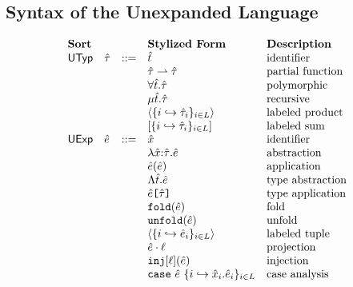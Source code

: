 \subsection{Syntax of the Unexpanded Language}\label{sec:syntax-U}
\begin{figure}[h!]
\[\begin{array}{lllllll}
\textbf{Sort} & &  
& \textbf{Stylized Form} & \textbf{Description}\\
\mathsf{UTyp} & {\hat\tau} & ::= 
& {\hat{t}} & \text{identifier}\\
&& 
& {\hat\tau} \rightharpoonup {\hat\tau} & \text{partial function}\\
&&
& \forall {\hat{t}}.{\hat\tau} & \text{polymorphic}\\
&&
& \mu {\hat{t}}.{\hat\tau} & \text{recursive}\\
&&
& \langle \{i \hookrightarrow {\hat\tau}_{i}\}_{i \in L} \rangle & \text{labeled product}\\
&&
& [\{i \hookrightarrow {\hat\tau}_{i}\}_{i \in L}] & \text{labeled sum}\\
\mathsf{UExp} & {\hat e} & ::= 
& {\hat x} & \text{identifier}\\
&&
& \lambda {\hat x}{:}{\hat\tau}.{\hat e} & \text{abstraction}\\
&&
& {\hat e}({\hat e}) & \text{application}\\
&&
& \Lambda {\hat{t}}.{\hat e} & \text{type abstraction}\\
&&
& {\hat e}\texttt{[}{\hat\tau}\texttt{]} & \text{type application}\\
&&
& \texttt{fold}({\hat e}) & \text{fold}\\
&&
& \texttt{unfold}({\hat e}) & \text{unfold}\\
&&
& \langle \{i \hookrightarrow {\hat e}_{i}\}_{i \in L}\rangle & \text{labeled tuple}\\
&&
& {\hat e} \cdot \ell & \text{projection}\\
&&
& \texttt{inj}[\ell]({\hat e}) & \text{injection}\\
&&
& \texttt{case}~{\hat e}~\{i \hookrightarrow {\hat x}_{i}.{\hat e}_{i}\}_{i \in L} & \text{case analysis}\\

\end{array}\]
\end{figure}
